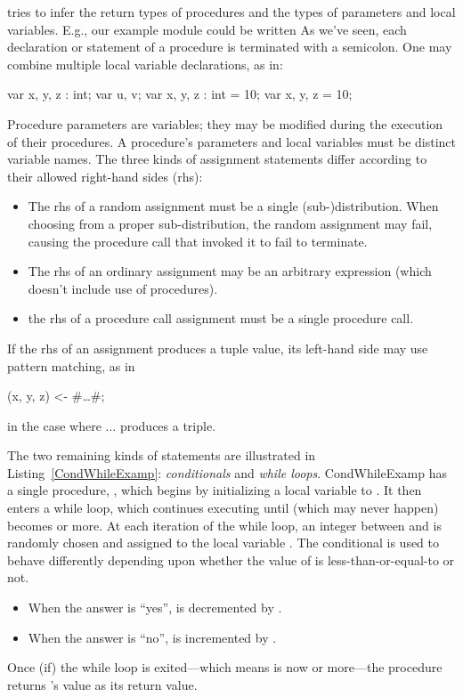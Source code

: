 \EasyCrypt tries to infer the return types of procedures and the
types of parameters and local variables. E.g., our example module
could be written  As we've seen, each
declaration or statement of a procedure is terminated with a
semicolon.  One may combine multiple local variable declarations, as
in:
\begin{easycrypt}{}{}
var x, y, z : int;
var u, v;
var x, y, z : int = 10;
var x, y, z = 10;
\end{easycrypt}
Procedure parameters are variables; they may be modified during the
execution of their procedures.  A procedure's parameters and local
variables must be distinct variable names.  The three kinds of
assignment statements differ according to their allowed right-hand
sides (rhs):
\begin{itemize}
\item The rhs of a random assignment must be a single
  (sub-)distribution. When choosing from a proper sub-distribution,
  the random assignment may fail, causing the procedure call that
  invoked it to fail to terminate.

\item The rhs of an ordinary assignment may be an arbitrary expression
  (which doesn't include use of procedures).

\item the rhs of a procedure call assignment must be a single procedure
  call.  
\end{itemize}
If the rhs of an assignment produces a tuple value, its left-hand side
may use pattern matching, as in
\begin{easycrypt}{}{}
(x, y, z) <- #\ldots#;
\end{easycrypt}
in the case where $\ldots$ produces a triple.

The two remaining kinds of statements are illustrated in
Listing~\ref{CondWhileExamp}: \emph{conditionals} and \emph{while
  loops}.
 {}{CondWhileExamp}
 has a single procedure,
, which begins by initializing a local variable  to
. It then enters a while loop, which continues executing until
(which may never happen)  becomes  or more. At each
iteration of the while loop, an integer between  and  is
randomly chosen and assigned to the local variable . The
conditional is used to behave differently depending upon whether the
value of  is less-than-or-equal-to  or not.
\begin{itemize}
\item When the answer is ``yes'',  is decremented by .

\item When the answer is ``no'',  is incremented by .
\end{itemize}
Once (if) the while loop is exited---which means  is now 
or more---the procedure returns 's value as its return value.

